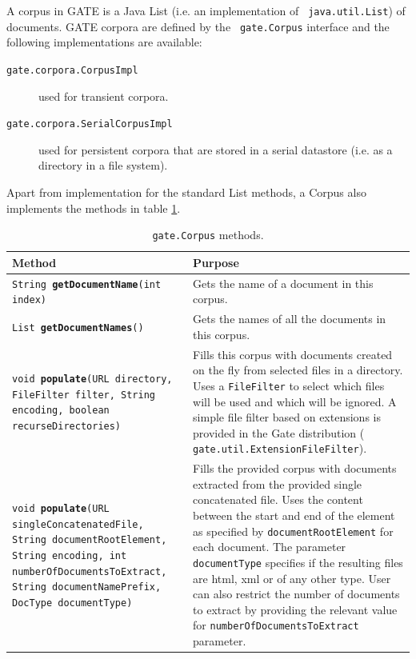 A corpus in GATE is a Java List (i.e. an implementation of {\tt
java.util.List}) of documents. GATE corpora are defined by the {\tt
gate.Corpus} interface and the following implementations are available:
\begin{description}
\item[{\tt gate.corpora.CorpusImpl}] used for transient corpora.
\item[{\tt gate.corpora.SerialCorpusImpl}] used for persistent corpora that
are stored in a serial datastore (i.e. as a directory in a file system).
\end{description}

Apart from implementation for the standard List methods, a Corpus also
implements the methods in table \ref{table:corpus}.

\begin{table}[htbp]
\begin{small}
\begin{center}
\begin{tabular}{|p{}|p{}|}
\hline
\textbf{Method} & \textbf{Purpose}\\
\hline
{\tt String {\bf getDocumentName}(int index)} & Gets the name of a document
in this corpus.\\
\hline
{\tt List {\bf getDocumentNames}()} & Gets the names of all the documents
in this corpus.\\
\hline
{\tt void {\bf populate}(URL directory, FileFilter filter, String encoding,
boolean recurseDirectories)} & Fills this corpus with documents created on
the fly from selected files in a directory. Uses a {\tt FileFilter} to
select which files will be used and which will be ignored. A simple file
filter based on extensions is provided in the Gate distribution ({\tt
gate.util.ExtensionFileFilter}).\\
{\tt void {\bf populate}(URL singleConcatenatedFile, String documentRootElement,
String encoding, int numberOfDocumentsToExtract, String documentNamePrefix, 
DocType documentType)} & Fills the provided corpus with documents extracted from
the provided single concatenated file. Uses the content between the start and 
end of the element as specified by {\tt documentRootElement} for each document.
The parameter {\tt documentType} specifies if the resulting files are html, xml
or of any other type. User can also restrict the number of documents to extract
by providing the relevant value for {\tt numberOfDocumentsToExtract} parameter.\\
\hline
\end{tabular}
\caption{{\tt gate.Corpus} methods.}
\label{table:corpus}
\end{center}
\end{small}
\end{table}

